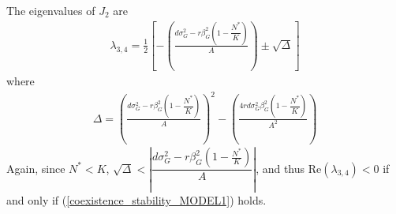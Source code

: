 \documentclass{amsart}
\theoremstyle{definition}
\theoremstyle{remark}
\numberwithin{equation}{section}
\begin{document}
\noindent The eigenvalues of $J_2$ are
\begin{align*}
	\lambda_{3,4} = \frac{1}{2}\left[-\left(\frac{d\sigma_G^2 - r\beta_G^2\left(1 - \dfrac{N^*}{K}\right)}{A}\right) \pm \sqrt{\Delta}\right]
\end{align*}
where
\begin{align*}
	\Delta = \left(\frac{d\sigma_G^2 - r\beta_G^2\left(1 - \dfrac{N^*}{K}\right)}{A}\right)^2 - \left(\frac{4rd\sigma_G^2\beta_G^2\left(1 - \dfrac{N^*}{K}\right)}{A^2}\right)
\end{align*}
Again, since $N^* < K$, $\sqrt{\Delta} < \left|\dfrac{d\sigma_G^2 - r\beta_G^2\left(1 - \frac{N^*}{K}\right)}{A}\right|$, and thus $\text{Re}(\lambda_{3,4}) < 0$ if and only if (\ref{coexistence_stability_MODEL1}) holds.
\end{document}
